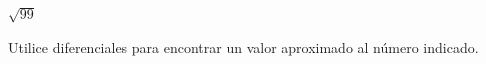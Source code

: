 \item $\sqrt{99}$
\par
Utilice diferenciales para encontrar un valor aproximado al número indicado.
